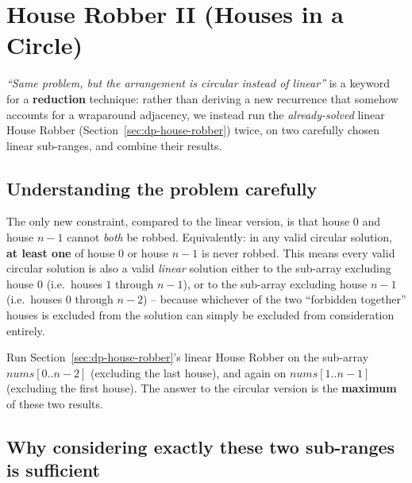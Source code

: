 \section{House Robber II (Houses in a Circle)}
\label{sec:dp-house-robber-2}


\begin{patternbox}
\emph{``Same problem, but the arrangement is circular instead of
linear''} is a keyword for a \textbf{reduction} technique: rather than
deriving a new recurrence that somehow accounts for a wraparound
adjacency, we instead run the \emph{already-solved} linear House Robber
(Section~\ref{sec:dp-house-robber}) twice, on two carefully chosen
linear sub-ranges, and combine their results.
\end{patternbox}

\subsection*{Understanding the problem carefully}

The only new constraint, compared to the linear version, is that house
$0$ and house $n-1$ cannot \emph{both} be robbed. Equivalently: in any
valid circular solution, \textbf{at least one} of house $0$ or house
$n-1$ is never robbed. This means every valid circular solution is also
a valid \emph{linear} solution either to the sub-array excluding house
$0$ (i.e.\ houses $1$ through $n-1$), or to the sub-array excluding
house $n-1$ (i.e.\ houses $0$ through $n-2$) -- because whichever of the
two ``forbidden together'' houses is excluded from the solution can
simply be excluded from consideration entirely.

\begin{ideabox}
Run Section~\ref{sec:dp-house-robber}'s linear House Robber on the
sub-array $\textit{nums}[0..n-2]$ (excluding the last house), and again
on $\textit{nums}[1..n-1]$ (excluding the first house). The answer to the
circular version is the \textbf{maximum} of these two results.
\end{ideabox}

\subsection*{Why considering exactly these two sub-ranges is sufficient}

